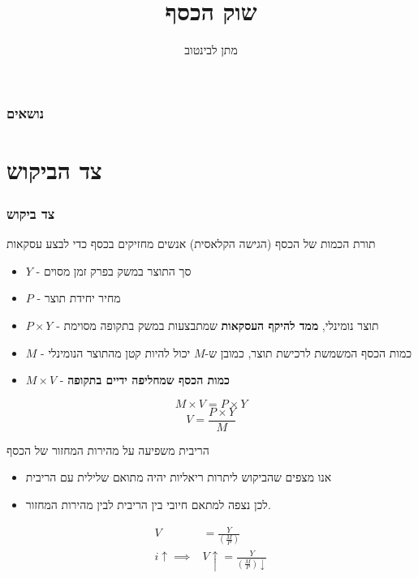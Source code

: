 \documentclass[usenames,dvipsnames,10pt]{beamer}
\title[]{שוק הכסף}
\author{מתן לבינטוב}
\institute[{{ אב"ג}}]{{ אוניברסיטת בן גוריון בנגב}}
\date{}
\begin{document}
\begin{RTL}
\begin{frame}
\titlepage
\end{frame}

\begin{frame}
    \frametitle{נושאים}
    \tableofcontents
\end{frame}

\section{צד הביקוש}
\begin{frame}[allowframebreaks]
    \frametitle{צד ביקוש}
    \begin{block}{תורת הכמות של הכסף (הגישה הקלאסית)}
        אנשים מחזיקים בכסף כדי לבצע עסקאות
    \begin{itemize}
        \item $Y$ - סך התוצר במשק בפרק זמן מסוים
        \item $P$ - מחיר יחידת תוצר
        \item $P \times Y$ - תוצר נומינלי, \textbf{ממד להיקף העסקאות} שמתבצעות במשק בתקופה מסוימת
        \item $M$ - כמות הכסף המשמשת לרכישת תוצר, כמובן ש-$M$ יכול להיות קטן מהתוצר הנומינלי
        \item $M \times V$ - \textbf{כמות הכסף שמחליפה ידיים בתקופה}
    \end{itemize}

    $$M \times V = P \times Y $$
    $$V = \frac{P \times Y}{M}$$

    \end{block}


    \begin{alertblock}{הריבית משפיעה על מהירות המחזור של הכסף}
        \begin{itemize}
            \item אנו מצפים שהביקוש ליתרות ריאליות יהיה מתואם שלילית עם הריבית
            \item לכן נצפה למתאם חיובי בין הריבית לבין מהירות המחזור.
        \end{itemize}
        \begin{align*}
            V &= \frac{Y}{\left(\frac{M}{P}\right)}\\
            i \uparrow \implies &V \uparrow = \frac{Y}{\left(\frac{M}{P}\right)\downarrow}
        \end{align*}
    \end{alertblock}
    


\end{frame}
\end{RTL}
\end{document}
